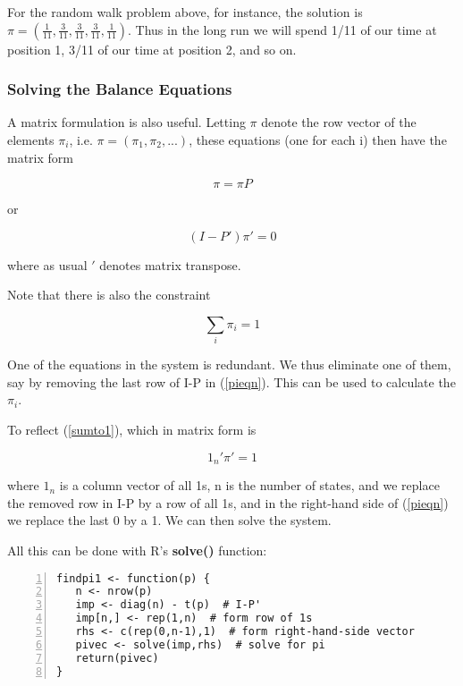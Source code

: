 For the random walk problem above, for instance, the solution is $\pi
=(\frac{1}{11},\frac{3}{11},\frac{3}{11},\frac{3}{11},\frac{1}{11})$.
Thus in the long run we will spend 1/11 of our time at position 1, 3/11
of our time at position 2, and so on.

\subsubsection{Solving the Balance Equations}
\label{solvbal}

A matrix formulation is also useful.  Letting $\pi $ denote the row
vector of the elements $\pi_{i}$, i.e.  $\pi = (\pi_1, \pi_2, ...)$,
these equations (one for each i) then have the matrix form

\begin{equation}
\label{eigen}
\pi =\pi P
\end{equation}


or

\begin{equation}
\label{pieqn}
(I-P') \pi' = 0
\end{equation}

where as usual $'$ denotes matrix transpose.

Note that there is also the constraint

\begin{equation}
\label{sumto1}
\sum_{i}\pi_{i}=1
\end{equation}

One of the equations in the system is redundant.   We thus eliminate one
of them, say by removing the last row of I-P in (\ref{pieqn}).  
This can be used to calculate the $\pi_{i}$.  

To reflect (\ref{sumto1}), which in matrix form is

\begin{equation}
1_n' \pi' = 1
\end{equation}

where $1_n$ is a column vector of all 1s, n is the number of states, and
we replace the removed row in I-P by a row of all 1s, and in the
right-hand side of (\ref{pieqn}) we replace the last 0 by a 1.  We can
then solve the system.  

All this can be done with R's {\bf solve()} function:

\begin{Verbatim}[fontsize=\relsize{-2},numbers=left]
findpi1 <- function(p) {
   n <- nrow(p)
   imp <- diag(n) - t(p)  # I-P'
   imp[n,] <- rep(1,n)  # form row of 1s
   rhs <- c(rep(0,n-1),1)  # form right-hand-side vector
   pivec <- solve(imp,rhs)  # solve for pi
   return(pivec)
}
\end{Verbatim}

